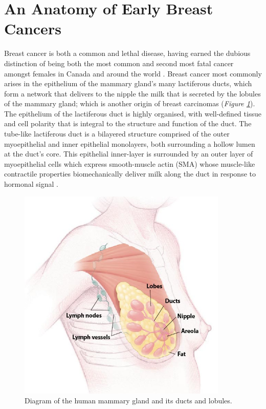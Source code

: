 \section{An Anatomy of Early Breast Cancers}
Breast cancer is both a common and lethal disease, having earned the dubious distinction of being both the most common and second most fatal cancer amongst females in Canada and around the world \citep{ccs2015}. Breast cancer most commonly arises in the epithelium of the mammary gland's many lactiferous ducts, which form a network that delivers to the nipple the milk that is secreted by the lobules of the mammary gland; which is another origin of breast carcinomas (\emph{Figure \ref{anatomy}}). The epithelium of the lactiferous duct is highly organised, with well-defined tissue and cell polarity that is integral to the structure and function of the duct. The tube-like lactiferous duct is a bilayered structure comprised of the outer myoepithelial and inner epithelial monolayers, both surrounding a hollow lumen at the duct's core. This epithelial inner-layer is surrounded by an outer layer of myoepithelial cells which express smooth-muscle actin (SMA) whose muscle-like contractile properties biomechanically deliver milk along the duct in response to hormonal signal \citep{Hamperl_1970}.\par

\begin{figure}[ht!]
	\centering
	\includegraphics[width=100mm]{figures/breast_anatomy.jpg}
	\caption{Diagram of the human mammary gland and its ducts and lobules. \label{anatomy}}
\end{figure}

